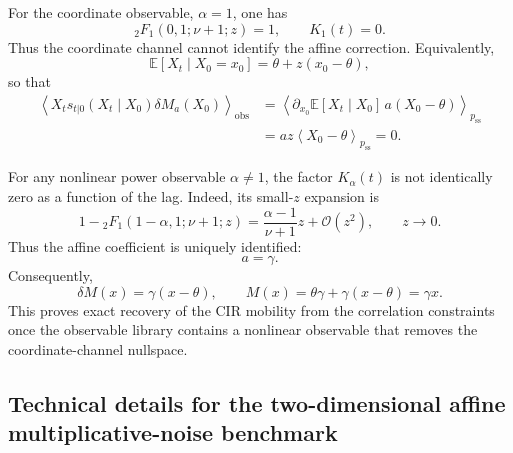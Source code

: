 \documentclass[11pt,twoside,fleqn]{article}
\begin{document}
For the coordinate observable, \(\alpha=1\), one has
\begin{equation}
    {}_2F_1(0,1;\nu+1;z)=1,
    \qquad
    K_1(t)=0.
    \label{eq:cir_coordinate_degeneracy_appendix}
\end{equation}
Thus the coordinate channel cannot identify the affine correction. Equivalently,
\begin{equation}
    \mathbb{E}[X_t\mid X_0=x_0]
    =
    \theta+z(x_0-\theta),
    \label{eq:cir_affine_conditional_mean_appendix}
\end{equation}
so that
\begin{equation}
\begin{aligned}
    \left\langle
        X_t s_{t|0}(X_t\mid X_0)\delta M_a(X_0)
    \right\rangle_{\mathrm{obs}}
    &=
    \left\langle
        \partial_{x_0}\mathbb{E}[X_t\mid X_0]\,
        a(X_0-\theta)
    \right\rangle_{p_{\mathrm{ss}}}
    \\
    &=
    az
    \left\langle
        X_0-\theta
    \right\rangle_{p_{\mathrm{ss}}}
    =
    0.
\end{aligned}
\label{eq:cir_coordinate_nullspace_appendix}
\end{equation}

For any nonlinear power observable \(\alpha\neq 1\), the factor \(K_\alpha(t)\) is not identically zero as a function of the lag. Indeed, its small-\(z\) expansion is
\begin{equation}
    1
    -
    {}_2F_1(1-\alpha,1;\nu+1;z)
    =
    \frac{\alpha-1}{\nu+1}z
    +
    \mathcal{O}(z^2),
    \qquad z\to 0.
    \label{eq:cir_K_nonzero_expansion_appendix}
\end{equation}
Thus the affine coefficient is uniquely identified:
\begin{equation}
    a=\gamma.
    \label{eq:cir_a_gamma_appendix}
\end{equation}
Consequently,
\begin{equation}
    \delta M(x)=\gamma(x-\theta),
    \qquad
    M(x)=\theta\gamma+\gamma(x-\theta)=\gamma x.
    \label{eq:cir_final_mobility_appendix}
\end{equation}
This proves exact recovery of the CIR mobility from the correlation constraints once the observable library contains a nonlinear observable that removes the coordinate-channel nullspace.


\subsection{Technical details for the two-dimensional affine multiplicative-noise benchmark}
\label{app:affine_multiplicative_2d_details}
\end{document}
